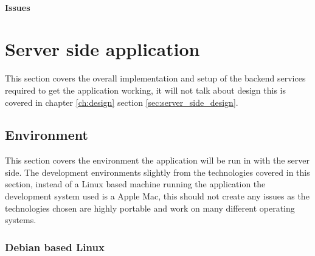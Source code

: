 \paragraph*{Issues}



\section{Server side application}

This section covers the overall implementation and setup of the backend services required to get the application working, it will not talk about design this is covered in chapter \ref{ch:design} section \ref{sec:server_side_design}.

\subsection{Environment}

This section covers the environment the application will be run in with the server side. The development environments slightly from the technologies covered in this section, instead of a Linux based machine running the application the development system used is a Apple Mac, this should not create any issues as the technologies chosen are highly portable and work on many different operating systems.

\subsubsection{Debian based Linux}
\label{sec:debian_server}

